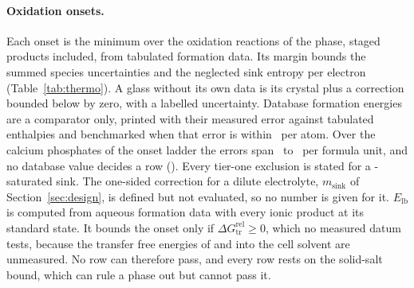 \paragraph*{Oxidation onsets.}
Each onset is the minimum over the oxidation reactions of the phase, staged products included, from tabulated formation data\cite{allison2013nist,rossini1971selected,rossini1981selected}. %
Its margin bounds the summed species uncertainties and the neglected sink entropy per electron (Table~\ref{tab:thermo}). %
A glass without its own data is its crystal plus a correction bounded below by zero, with a labelled uncertainty. %
Database formation energies are a comparator only, printed with their measured error against tabulated enthalpies and benchmarked when that error is within \NumDftTolerance\ per atom. %
Over the calcium phosphates of the onset ladder the errors span \NumDftCaPhosLow\ to \NumDftCaPhosHigh\ per formula unit, and no database value decides a row (). %
Every tier-one exclusion is stated for a -saturated sink. %
The one-sided correction for a dilute electrolyte, $m_\mathrm{sink}$ of Section~\ref{sec:design}, is defined but not evaluated, so no number is given for it. %
$E_\mathrm{lb}$ is computed from aqueous formation data with every ionic product at its standard state. %
It bounds the onset only if $\Delta G_\mathrm{tr}^\mathrm{rel}\ge0$, which no measured datum tests, because the transfer free energies of  and  into the cell solvent are unmeasured. %
No row can therefore pass, and every row rests on the solid-salt bound, which can rule a phase out but cannot pass it. %

\begin{table}[t]
\caption{Thermochemistry benchmark: the governing oxidation reaction of each ladder entry on the experimental route of tabulated formation data\cite{allison2013nist,rossini1971selected,rossini1981selected}, its upper bound $E_\mathrm{ub}$ for the solid  sink and the margin $m$ of its uncertainty budget, and the database comparator with its measured error against tabulated enthalpies (benchmarked within \NumDftTolerance\ per atom). Every reaction and the database spread are in .}
\label{tab:thermo}
\nacreBenchmarkTable
\end{table}

